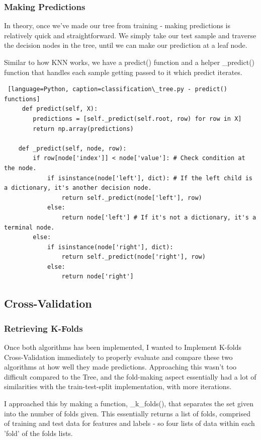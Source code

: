 \documentclass[letterpaper,10pt]{article}
\begin{document}
\subsubsection{Making Predictions}
In theory, once we've made our tree from training - making predictions is relatively quick and straightforward. We simply take our test sample and traverse the decision nodes in the tree, until we can make our prediction at a leaf node. \par
Similar to how KNN works, we have a predict() function and a helper \_predict() function that handles each sample getting passed to it which predict iterates. \par

\begin{lstlisting} [language=Python, caption=classification\_tree.py - predict() functions]
     def predict(self, X):
        predictions = [self._predict(self.root, row) for row in X]
        return np.array(predictions)

    def _predict(self, node, row):
        if row[node['index']] < node['value']: # Check condition at the node.
            if isinstance(node['left'], dict): # If the left child is a dictionary, it's another decision node.
                return self._predict(node['left'], row)
            else:
                return node['left'] # If it's not a dictionary, it's a terminal node.
        else:
            if isinstance(node['right'], dict):
                return self._predict(node['right'], row)
            else:
                return node['right']
\end{lstlisting}

\subsection{Cross-Validation}
\subsubsection{Retrieving K-Folds}
Once both algorithms has been implemented, I wanted to Implement K-folds Cross-Validation immediately to properly evaluate and compare these two algorithms at how well they made predictions. Approaching this wasn't too difficult compared to the Tree, and the fold-making aspect essentially had a lot of similarities with the train-test-split implementation, with more iterations. \par
I approached this by making a function, \_k\_folds(), that separates the set given into the number of folds given. This essentially returns a list of folds, comprised of training and test data for features and labels - so four lists of data within each 'fold' of the folds lists. \par
\end{document}
